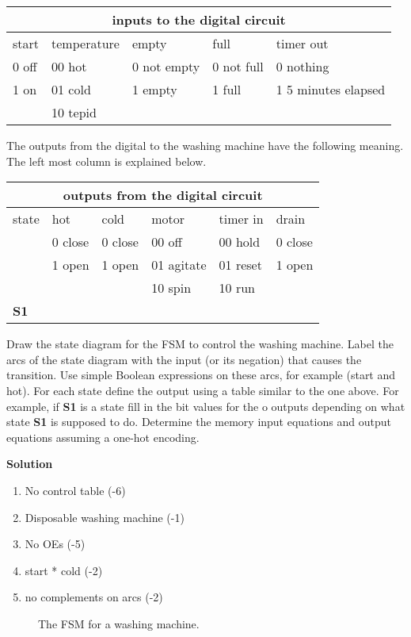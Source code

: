 \begin{enumerate}
\begin{tabular}{|l|l|l|l|l|} \hline
\multicolumn{5}{|c|}{inputs to the digital circuit}		\\ \hline \hline
start & temperature & empty       & full       & timer out 	\\ \hline	
0 off & 00 hot      & 0 not empty & 0 not full & 0 nothing	\\ \hline 
1 on  & 01 cold     & 1 empty     & 1 full     & 1 5 minutes elapsed 	\\ \hline 
      & 10 tepid    &		  &	       &		\\ \hline
\end{tabular}

The outputs from the digital to the washing machine have the following meaning.
The left most column is explained below.

\begin{tabular}{|l|||l|l|l|l|l|} \hline
\multicolumn{6}{|c|}{outputs from the digital circuit}			\\ \hline \hline
state & hot     & cold    & motor      & timer in   & drain 	\\ \hline
      & 0 close & 0 close & 00 off     & 00 hold    & 0 close	\\ \hline
      & 1 open  & 1 open  & 01 agitate & 01 reset   & 1 open	\\ \hline
      &		&         & 10 spin    & 10 run     &		\\ \hline \hline
\textbf{ S1}    &	&	  &	       &	    &		\\ \hline
\end{tabular}

Draw the state diagram for the FSM to control the washing machine.  
Label the arcs of the state diagram with the input (or its negation) 
that causes the transition.  Use simple Boolean expressions on these 
arcs, for example (start and hot).
For each state define the output using a table similar to the one above.
For example, if \textbf{ S1} is a state fill in the bit values for the o
outputs depending on what state \textbf{ S1} is supposed to do.
Determine the memory input equations and output equations assuming a one-hot 
encoding.

\begin{onlysolution}  \textbf{Solution} \itshape{
    \begin{enumerate}
    \item No control table (-6)
    \item Disposable washing machine (-1)
    \item No OEs (-5)
    \item start * cold (-2)
    \item no complements on arcs (-2)
    \end{enumerate}
\begin{figure}[ht]
\caption{The FSM for a washing machine.}
\end{figure}

}
\end{onlysolution}
\end{enumerate}
